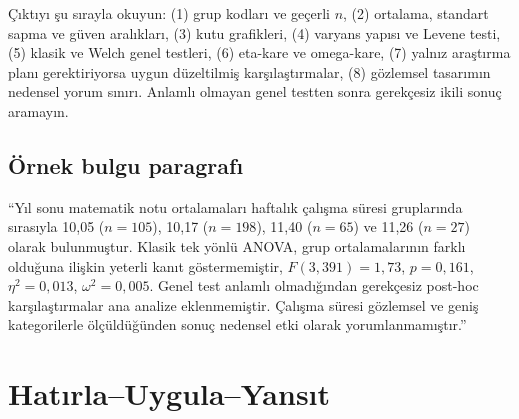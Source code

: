 \begin{outputguidebox}
Çıktıyı şu sırayla okuyun: (1) grup kodları ve geçerli $n$, (2) ortalama,
standart sapma ve güven aralıkları, (3) kutu grafikleri, (4) varyans yapısı ve
Levene testi, (5) klasik ve Welch genel testleri, (6) eta-kare ve omega-kare,
(7) yalnız araştırma planı gerektiriyorsa uygun düzeltilmiş karşılaştırmalar,
(8) gözlemsel tasarımın nedensel yorum sınırı. Anlamlı olmayan genel testten
sonra gerekçesiz ikili sonuç aramayın.
\end{outputguidebox}

\subsection{Örnek bulgu paragrafı}

``Yıl sonu matematik notu ortalamaları haftalık çalışma süresi gruplarında
sırasıyla 10,05 ($n=105$), 10,17 ($n=198$), 11,40 ($n=65$) ve 11,26
($n=27$) olarak bulunmuştur. Klasik tek yönlü ANOVA, grup ortalamalarının
farklı olduğuna ilişkin yeterli kanıt göstermemiştir,
$F(3,391)=1{,}73$, $p=0{,}161$, $\eta^2=0{,}013$,
$\omega^2=0{,}005$. Genel test anlamlı olmadığından gerekçesiz post-hoc
karşılaştırmalar ana analize eklenmemiştir. Çalışma süresi gözlemsel ve geniş
kategorilerle ölçüldüğünden sonuç nedensel etki olarak yorumlanmamıştır.''





\section*{Hatırla--Uygula--Yansıt}

